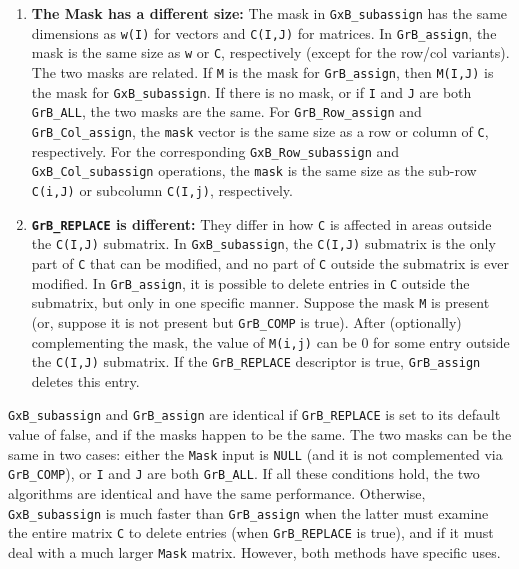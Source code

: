 \documentclass[12pt]{article}
\begin{document}
{\begin{enumerate}
\item {\bf The Mask has a different size:}
    The mask in \verb'GxB_subassign' has the same dimensions as \verb'w(I)' for
    vectors and \verb'C(I,J)' for matrices.  In \verb'GrB_assign', the mask is
    the same size as \verb'w' or \verb'C', respectively (except for the row/col
    variants).  The two masks are related.  If \verb'M' is the mask for
    \verb'GrB_assign', then \verb'M(I,J)' is the mask for \verb'GxB_subassign'.
    If there is no mask, or if \verb'I' and \verb'J' are both \verb'GrB_ALL',
    the two masks are the same.
    For \verb'GrB_Row_assign' and \verb'GrB_Col_assign', the \verb'mask' vector
    is the same size as a row or column of \verb'C', respectively.  For the
    corresponding \verb'GxB_Row_subassign' and \verb'GxB_Col_subassign'
    operations, the \verb'mask' is the same size as the sub-row \verb'C(i,J)' or
    subcolumn \verb'C(I,j)', respectively.

\item {\bf \verb'GrB_REPLACE' is different:}
    They differ in how \verb'C' is affected in areas outside the \verb'C(I,J)'
    submatrix.  In \verb'GxB_subassign', the \verb'C(I,J)' submatrix is the
    only part of \verb'C' that can be modified, and no part of \verb'C' outside
    the submatrix is ever modified.  In \verb'GrB_assign', it is possible to
    delete entries in \verb'C' outside the submatrix, but only in one specific
    manner.  Suppose the mask \verb'M' is present (or, suppose it is not
    present but \verb'GrB_COMP' is true).  After (optionally) complementing the
    mask, the value of \verb'M(i,j)' can be 0 for some entry outside the
    \verb'C(I,J)' submatrix.  If the \verb'GrB_REPLACE' descriptor is
    true, \verb'GrB_assign' deletes this entry.

\end{enumerate}

\verb'GxB_subassign' and \verb'GrB_assign' are identical if \verb'GrB_REPLACE'
is set to its default value of false, and if the masks happen to be the same.
The two masks can be the same in two cases:  either the \verb'Mask' input is
\verb'NULL' (and it is not complemented via \verb'GrB_COMP'), or \verb'I' and
\verb'J' are both \verb'GrB_ALL'.
If all these conditions hold,
the two algorithms are identical and have the same performance.  Otherwise,
\verb'GxB_subassign' is much faster than \verb'GrB_assign' when the latter
must examine the entire matrix \verb'C' to delete entries (when
\verb'GrB_REPLACE' is true), and if it must deal with a much larger \verb'Mask'
matrix.  However, both methods have specific uses.

}
\end{document}

